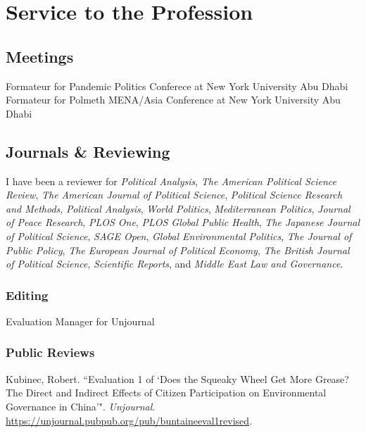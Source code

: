 \documentclass[11pt, a4paper]{article}
\newcommand{\years}[1]{\marginnote{\scriptsize #1}}
\begin{document}
\section*{Service to the Profession}

\subsection*{Meetings}

\years{2023}Formateur for Pandemic Politics Conferece at New York University Abu Dhabi\\
\years{2024}Formateur for Polmeth MENA/Asia Conference at New York University Abu Dhabi 

\subsection*{Journals \& Reviewing}

I have been a reviewer for \emph{Political Analysis}, \emph{The American Political Science Review}, \emph{The American Journal of Political Science}, \emph{Political Science Research and Methods}, \emph{Political Analysis}, \emph{World Politics}, \emph{Mediterranean Politics}, \emph{Journal of Peace Research}, \emph{PLOS One}, \emph{PLOS Global Public Health}, \emph{The Japanese Journal of Political Science}, \emph{SAGE Open}, \emph{Global Environmental Politics}, \emph{The Journal of Public Policy}, \emph{The European Journal of Political Economy}, \emph{The British Journal of Political Science}, \emph{Scientific Reports}, and \emph{Middle East Law and Governance}.\\

\subsubsection*{Editing}

\years{2023-2024} Evaluation Manager for Unjournal

\subsubsection*{Public Reviews}

\years{2023}Kubinec, Robert. ``Evaluation 1 of `Does the Squeaky Wheel Get More Grease? The Direct and Indirect Effects of Citizen Participation on Environmental Governance in China'". \emph{Unjournal}. \url{https://unjournal.pubpub.org/pub/buntaineeval1revised}.

%
\end{document}
